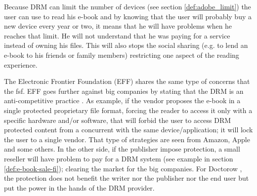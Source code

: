 \documentclass[11pt,a4paper,oneside]{memoir}
\begin{document}
Because DRM can limit the number of devices (see section \vref{def:adobe_limit}) the user can use to read his e-book and by knowing that the user will probably buy a new device every year or two, it means that he will have problems when he reaches that limit. He will not understand that he was paying for a service instead of owning his files. This will also stops the social sharing (e.g. to lend an e-book to his friends or family members) restricting one aspect of the reading experience.

The Electronic Frontier Foundation (EFF) shares the same type of concerns that the fsf. EFF goes further against big companies by stating that the DRM is an anti-competitive practice \cite{eff:drm}. \label{def:opp:anti-competitive} As example, if the vendor proposes the e-book in a single protected proprietary file format, forcing the reader to access it only with a specific hardware and/or software, that will forbid the user to access DRM protected content from a concurrent with the same device/application; it will lock the user to a single vendor. That type of strategies are seen from Amazon, Apple and some others. In the other side, if the publisher impose protection, a small reseller will have problem to pay for a DRM system (see example in section \vref{def:e-book-sale-fi}); clearing the market for the big companies. For Doctorow \cite[chapter 28]{doctorow:context}, the protection does not benefit the writer nor the publisher nor the end user but put the power in the hands of the DRM provider.
\end{document}
